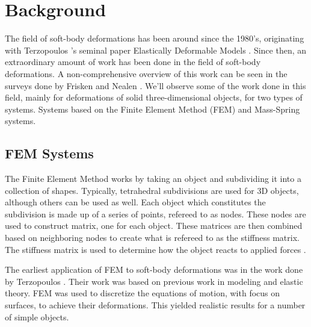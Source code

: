 \section{Background}

The field of soft-body deformations has been around since the 1980's, originating with Terzopoulos
\etal's seminal paper Elastically Deformable Models \cite{Elastically-Deformable-Models}. Since 
then, an extraordinary amount of work has been done in the field of soft-body deformations. A 
non-comprehensive overview of this work can be seen in the surveys done by Frisken \etal 
\cite{A-Survey-of-Deformable-Modeling-in-Computer-Graphics} and Nealen \etal
\cite{Phyiscally-Based-Deformable-Models-in-Computer-Graphics}.
We'll observe some of the work done in this field, mainly for deformations of solid 
three-dimensional objects, for two types of systems. Systems based on the Finite Element Method 
(FEM) and Mass-Spring systems. 

\subsection{FEM Systems}

The Finite Element Method works by taking an object and subdividing it into a collection of shapes.
Typically, tetrahedral subdivisions are used for 3D objects, although others can be used as well.
Each object which constitutes the subdivision is made up of a series of points, refereed to as nodes.
These nodes are used to construct matrix, one for each object. These matrices are then combined 
based on neighboring nodes to create what is refereed to as the stiffness matrix. The stiffness 
matrix is used to determine how the object reacts to applied forces \cite{FEM-Explenation}.

The earliest application of FEM to soft-body deformations was in the work done by Terzopoulos \etal
\cite{Elastically-Deformable-Models}. Their work was based on previous work in modeling and 
elastic theory. FEM was used to discretize the equations of motion, with 
focus on surfaces, to achieve their deformations. This yielded realistic results for a number of 
simple objects. 

